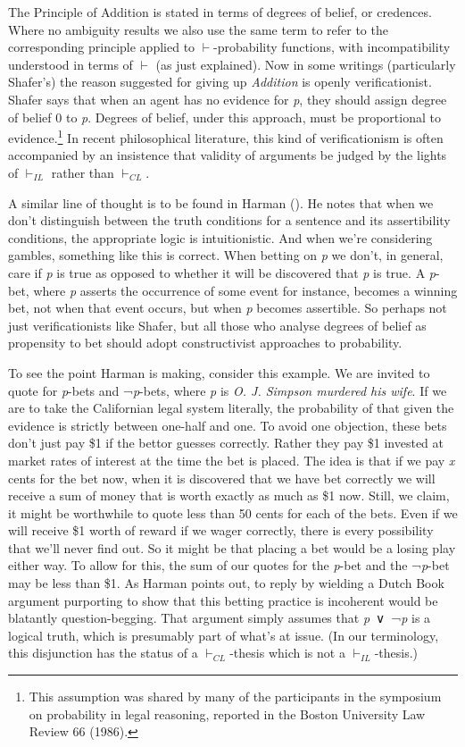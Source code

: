 \documentclass[
  10pt,
  letterpaper,
  DIV=11,
  numbers=noendperiod,
  twoside]{scrartcl}
\begin{document}
The Principle of Addition is stated in terms of degrees of belief, or
credences. Where no ambiguity results we also use the same term to refer
to the corresponding principle applied to \(\vdash\)-probability
functions, with incompatibility understood in terms of \(\vdash\) (as
just explained). Now in some writings (particularly Shafer's) the reason
suggested for giving up \emph{Addition} is openly verificationist.
Shafer says that when an agent has no evidence for \emph{p}, they should
assign degree of belief 0 to \emph{p}. Degrees of belief, under this
approach, must be proportional to evidence.\footnote{This assumption was
  shared by many of the participants in the symposium on probability in
  legal reasoning, reported in the Boston University Law Review 66
  (1986).} In recent philosophical literature, this kind of
verificationism is often accompanied by an insistence that validity of
arguments be judged by the lights of \(\vdash_{IL}\) rather than
\(\vdash_{CL}\).

A similar line of thought is to be found in Harman
(). He notes that when we don't
distinguish between the truth conditions for a sentence and its
assertibility conditions, the appropriate logic is intuitionistic. And
when we're considering gambles, something like this is correct. When
betting on \emph{p} we don't, in general, care if \emph{p} is true as
opposed to whether it will be discovered that \emph{p} is true. A
\emph{p}-bet, where \emph{p} asserts the occurrence of some event for
instance, becomes a winning bet, not when that event occurs, but when
\emph{p} becomes assertible. So perhaps not just verificationists like
Shafer, but all those who analyse degrees of belief as propensity to bet
should adopt constructivist approaches to probability.

To see the point Harman is making, consider this example. We are invited
to quote for \emph{p}-bets and ¬\emph{p}-bets, where \emph{p} is
\emph{O. J. Simpson murdered his wife}. If we are to take the
Californian legal system literally, the probability of that given the
evidence is strictly between one-half and one. To avoid one objection,
these bets don't just pay \$1 if the bettor guesses correctly. Rather
they pay \$1 invested at market rates of interest at the time the bet is
placed. The idea is that if we pay \emph{x} cents for the bet now, when
it is discovered that we have bet correctly we will receive a sum of
money that is worth exactly as much as \$1 now. Still, we claim, it
might be worthwhile to quote less than 50 cents for each of the bets.
Even if we will receive \$1 worth of reward if we wager correctly, there
is every possibility that we'll never find out. So it might be that
placing a bet would be a losing play either way. To allow for this, the
sum of our quotes for the \emph{p}-bet and the ¬\emph{p}-bet may be less
than \$1. As Harman points out, to reply by wielding a Dutch Book
argument purporting to show that this betting practice is incoherent
would be blatantly question-begging. That argument simply assumes that
\emph{p}~∨~¬\emph{p} is a logical truth, which is presumably part of
what's at issue. (In our terminology, this disjunction has the status of
a \(\vdash_{CL}\)-thesis which is not a \(\vdash_{IL}\)-thesis.)
\end{document}
